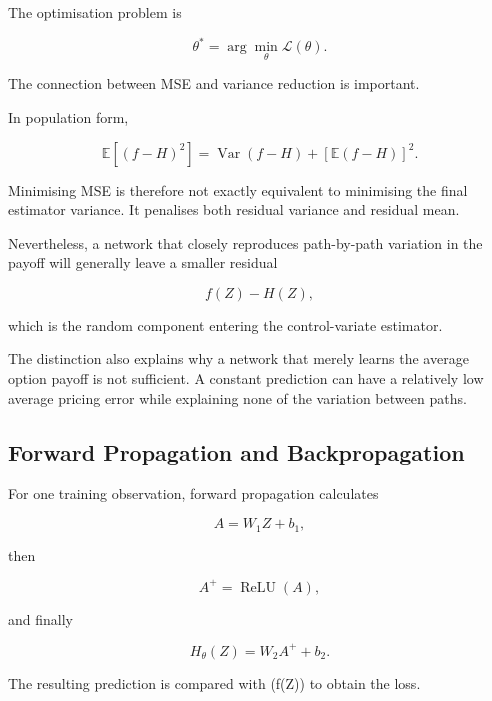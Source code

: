 \documentclass[12pt,a4paper]{report}
\begin{document}
The optimisation problem is

\begin{equation}
\theta^*
=
\arg\min_\theta
\mathcal{L}(\theta).
\end{equation}

The connection between MSE and variance reduction is important.

In population form,

\begin{equation}
\mathbb{E}
\left[
(f-H)^2
\right]
=
\operatorname{Var}(f-H)
+
\left[
\mathbb{E}(f-H)
\right]^2.
\end{equation}

Minimising MSE is therefore not exactly equivalent to minimising the final estimator variance. It penalises both residual variance and residual mean.

Nevertheless, a network that closely reproduces path-by-path variation in the payoff will generally leave a smaller residual

\begin{equation}
f(Z)-H(Z),
\end{equation}

which is the random component entering the control-variate estimator.

The distinction also explains why a network that merely learns the average option payoff is not sufficient. A constant prediction can have a relatively low average pricing error while explaining none of the variation between paths.

\subsection{Forward Propagation and Backpropagation}

For one training observation, forward propagation calculates

\begin{equation}
A
=
W_1Z+b_1,
\end{equation}

then

\begin{equation}
A^+
=
\operatorname{ReLU}(A),
\end{equation}

and finally

\begin{equation}
H_\theta(Z)
=
W_2A^+
+
b_2.
\end{equation}

The resulting prediction is compared with (f(Z)) to obtain the loss.
\end{document}
